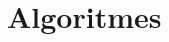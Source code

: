 \documentclass[main.tex]{subfiles}
\begin{document}
\chapter{Algoritmes}
\label{cha:algoritmes}
\end{document}
